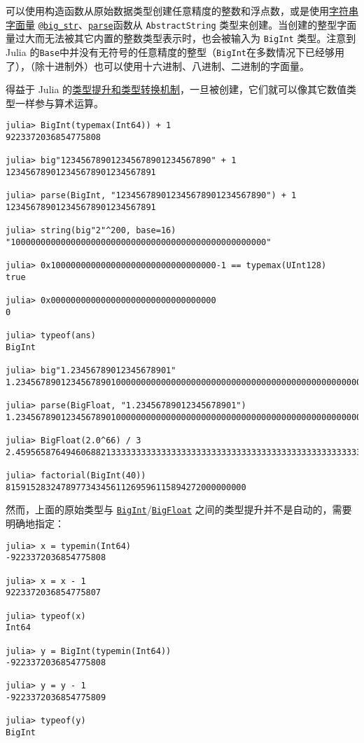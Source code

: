 可以使用构造函数从原始数据类型创建任意精度的整数和浮点数，或是使用\hyperlink{6548320458095485939}{字符串字面量} \hyperlink{4226571565562941917}{\texttt{@big\_str}}、\hyperlink{14207407853646164654}{\texttt{parse}}函数从 \texttt{AbstractString} 类型来创建。当创建的整型字面量过大而无法被其它内置的整数类型表示时，也会被输入为 \texttt{BigInt} 类型。注意到 Julia 的\texttt{Base}中并没有无符号的任意精度的整型（\texttt{BigInt}在多数情况下已经够用了），（除十进制外）也可以使用十六进制、八进制、二进制的字面量。



得益于 Julia 的\hyperlink{10374023657104680331}{类型提升和类型转换机制}，一旦被创建，它们就可以像其它数值类型一样参与算术运算。




\begin{verbatim}
julia> BigInt(typemax(Int64)) + 1
9223372036854775808

julia> big"123456789012345678901234567890" + 1
123456789012345678901234567891

julia> parse(BigInt, "123456789012345678901234567890") + 1
123456789012345678901234567891

julia> string(big"2"^200, base=16)
"100000000000000000000000000000000000000000000000000"

julia> 0x100000000000000000000000000000000-1 == typemax(UInt128)
true

julia> 0x000000000000000000000000000000000
0

julia> typeof(ans)
BigInt

julia> big"1.23456789012345678901"
1.234567890123456789010000000000000000000000000000000000000000000000000000000004

julia> parse(BigFloat, "1.23456789012345678901")
1.234567890123456789010000000000000000000000000000000000000000000000000000000004

julia> BigFloat(2.0^66) / 3
2.459565876494606882133333333333333333333333333333333333333333333333333333333344e+19

julia> factorial(BigInt(40))
815915283247897734345611269596115894272000000000
\end{verbatim}



然而，上面的原始类型与 \hyperlink{423405808990690832}{\texttt{BigInt}}/\hyperlink{749816618809421837}{\texttt{BigFloat}} 之间的类型提升并不是自动的，需要明确地指定：




\begin{verbatim}
julia> x = typemin(Int64)
-9223372036854775808

julia> x = x - 1
9223372036854775807

julia> typeof(x)
Int64

julia> y = BigInt(typemin(Int64))
-9223372036854775808

julia> y = y - 1
-9223372036854775809

julia> typeof(y)
BigInt
\end{verbatim}



